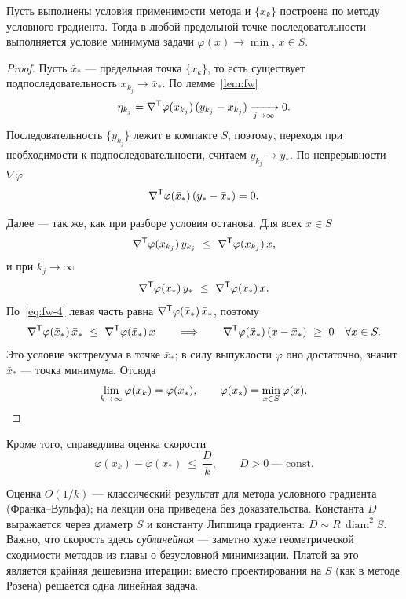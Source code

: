 \begin{theorem}\label{thm:fw}
Пусть выполнены условия применимости метода и $\{x_k\}$ построена по методу
условного градиента. Тогда в любой предельной точке последовательности
выполняется условие минимума задачи $\varphi(x) \to \min$, $x \in S$.
\end{theorem}

\begin{proof}
Пусть $\bar{x}_*$ — предельная точка $\{x_k\}$, то есть существует
подпоследовательность $x_{k_j} \to \bar{x}_*$. По лемме~\ref{lem:fw}
\[
  \eta_{k_j} = \nabla^{\mathsf{T}}\varphi(x_{k_j})\,(y_{k_j} - x_{k_j})
  \xrightarrow[j \to \infty]{} 0 .
\]
Последовательность $\{y_{k_j}\}$ лежит в компакте $S$, поэтому, переходя при
необходимости к подпоследовательности, считаем $y_{k_j} \to y_*$. По
непрерывности $\nabla\varphi$
\begin{equation}\label{eq:fw-4}
  \nabla^{\mathsf{T}}\varphi(\bar{x}_*)\,(y_* - \bar{x}_*) = 0 .
\end{equation}

Далее — так же, как при разборе условия останова. Для всех $x \in S$
\[
  \nabla\T\varphi(x_{k_j})\, y_{k_j} \ \le\ \nabla\T\varphi(x_{k_j})\, x ,
\]
и при $k_j \to \infty$
\[
  \nabla\T\varphi(\bar{x}_*)\, y_* \ \le\ \nabla\T\varphi(\bar{x}_*)\, x .
\]
По~\eqref{eq:fw-4} левая часть равна
$\nabla^{\mathsf{T}}\varphi(\bar{x}_*)\,\bar{x}_*$, поэтому
\[
  \nabla^{\mathsf{T}}\varphi(\bar{x}_*)\, \bar{x}_* \ \le\ \nabla^{\mathsf{T}}\varphi(\bar{x}_*)\, x
  \qquad\Longrightarrow\qquad
  \nabla^{\mathsf{T}}\varphi(\bar{x}_*)\,(x - \bar{x}_*) \ \ge\ 0 \quad \forall x \in S .
\]
Это условие экстремума в точке $\bar{x}_*$; в силу выпуклости $\varphi$ оно
достаточно, значит $\bar{x}_*$ — точка минимума. Отсюда
\[
  \lim_{k \to \infty} \varphi(x_k) = \varphi(x_*) ,
  \qquad \varphi(x_*) = \min_{x \in S} \varphi(x) .
  \qedhere
\]
\end{proof}

\begin{remark}
Кроме того, справедлива оценка скорости
\[
  \varphi(x_k) - \varphi(x_*) \ \le\ \frac{D}{k} ,
  \qquad D > 0 \ \text{— const} .
\]
\end{remark}

\begin{idea}
Оценка $O(1/k)$ — классический результат для метода условного градиента
(Франка--Вульфа); на лекции она приведена без доказательства. Константа $D$
выражается через диаметр $S$ и константу Липшица градиента:
$D \sim R\,\operatorname{diam}^2 S$. Важно, что скорость здесь \emph{сублинейная}
— заметно хуже геометрической сходимости методов из главы о безусловной
минимизации. Платой за это является крайняя дешевизна итерации: вместо
проектирования на $S$ (как в методе Розена) решается одна линейная задача.
\end{idea}
